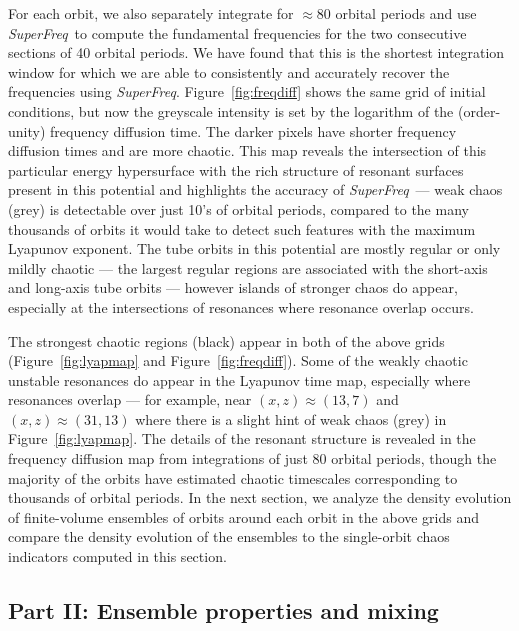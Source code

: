 \documentclass[letterpaper,12pt,preprint]{aastex}
\newcommand{\project}[1]{\textsl{#1}}
\newcommand{\superfreq}{\project{SuperFreq}}
\begin{document}
For each orbit, we also separately integrate for $\approx$80 orbital periods and use \superfreq\ to compute the fundamental frequencies for the two consecutive sections of 40 orbital periods. We have found that this is the shortest integration window for which we are able to consistently and accurately recover the frequencies using \superfreq. Figure~\ref{fig:freqdiff} shows the same grid of initial conditions, but now the greyscale intensity is set by the logarithm of the (order-unity) frequency diffusion time. The darker pixels have shorter frequency diffusion times and are more chaotic. This map reveals the intersection of this particular energy hypersurface with the rich structure of resonant surfaces present in this potential and highlights the accuracy of \superfreq\ --- weak chaos (grey) is detectable over just 10's of orbital periods, compared to the many thousands of orbits it would take to detect such features with the maximum Lyapunov exponent. The tube orbits in this potential are mostly regular or only mildly chaotic --- the largest regular regions are associated with the short-axis and long-axis tube orbits --- however islands of stronger chaos do appear, especially at the intersections of resonances where resonance overlap occurs. 

The strongest chaotic regions (black) appear in both of the above grids (Figure~\ref{fig:lyapmap} and Figure~\ref{fig:freqdiff}). Some of the weakly chaotic unstable resonances do appear in the Lyapunov time map, especially where resonances overlap --- for example, near $(x,z) \approx(13,7)$ and $(x,z) \approx(31,13)$ where there is a slight hint of weak chaos (grey) in Figure~\ref{fig:lyapmap}. The details of the resonant structure is revealed in the frequency diffusion map from integrations of just 80 orbital periods, though the majority of the orbits have estimated chaotic timescales corresponding to thousands of orbital periods. In the next section, we analyze the density evolution of finite-volume ensembles of orbits around each orbit in the above grids and compare the density evolution of the ensembles to the single-orbit chaos indicators computed in this section.

\subsection{Part II: Ensemble properties and mixing} \label{sec:results2}
\end{document}
